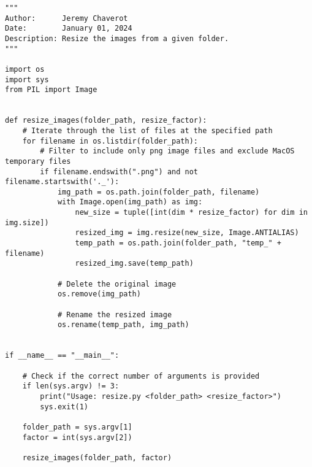 \begin{lstlisting}[style=pythonstyle, label=lst:6, caption=Python script \texttt{resize.py} designed to alter an image's size with respect to a specified resize factor.]
"""
Author:      Jeremy Chaverot
Date:        January 01, 2024
Description: Resize the images from a given folder.
"""

import os
import sys
from PIL import Image


def resize_images(folder_path, resize_factor):
	# Iterate through the list of files at the specified path
    for filename in os.listdir(folder_path):
    	# Filter to include only png image files and exclude MacOS temporary files
        if filename.endswith(".png") and not filename.startswith('._'):
            img_path = os.path.join(folder_path, filename)
            with Image.open(img_path) as img:
                new_size = tuple([int(dim * resize_factor) for dim in img.size])
                resized_img = img.resize(new_size, Image.ANTIALIAS)
                temp_path = os.path.join(folder_path, "temp_" + filename)
                resized_img.save(temp_path)

            # Delete the original image
            os.remove(img_path)

            # Rename the resized image
            os.rename(temp_path, img_path)


if __name__ == "__main__":

	# Check if the correct number of arguments is provided
    if len(sys.argv) != 3:
        print("Usage: resize.py <folder_path> <resize_factor>")
        sys.exit(1)

    folder_path = sys.argv[1]
    factor = int(sys.argv[2])

    resize_images(folder_path, factor)
\end{lstlisting}

\cleardoublepage{}

